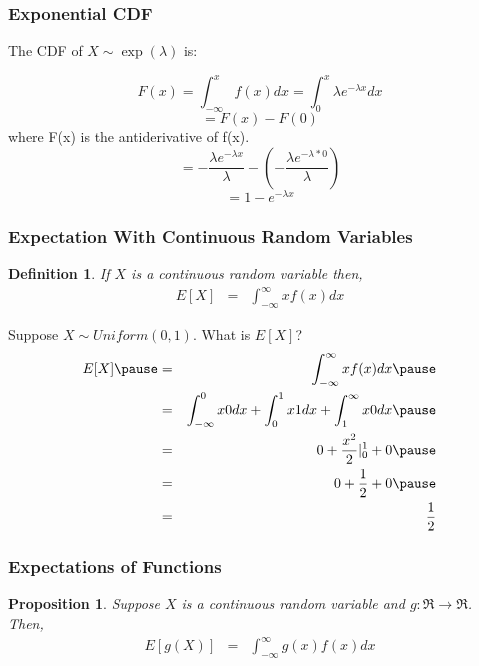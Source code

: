 \documentclass[handout]{beamer}
\newtheorem{prop}{Proposition}
\newtheorem{defn}{Definition}
\numberwithin{equation}{section}
\begin{document}
\begin{frame}
\frametitle{Exponential CDF}
The CDF of $X\sim\exp(\lambda)$ is:

$$F(x)= \int_{-\infty}^x f(x)dx=\int_{0}^x \lambda e^{-\lambda x}dx$$\pause
$$= F(x)-F(0)$$\pause
where F(x) is the antiderivative of f(x).\pause
$$= - \frac{\lambda e^{-\lambda x}}{\lambda} - (- \frac{\lambda e^{-\lambda*0}}{\lambda})$$\pause
$$=1-e^{-\lambda x}$$
\end{frame}



\begin{frame}
\frametitle{Expectation With Continuous Random Variables} 

\begin{defn} 
If $X$ is a continuous random variable then, 
\begin{eqnarray}
E[X] & = & \int_{-\infty}^{\infty} x f(x) dx \nonumber 
\end{eqnarray}
\end{defn} 


\end{frame}


\begin{frame}
Suppose $X \sim Uniform(0,1)$.  What is $E[X]$? \pause 
\begin{eqnarray}
E[X] \pause & = & \int_{-\infty}^{\infty} xf(x)dx \nonumber  \pause \\
& = & \int_{-\infty}^{0} x 0 dx + \int_{0}^{1} x 1 dx + \int_{1}^{\infty} x 0 dx \nonumber \pause  \\
& = & 0 +  \frac{x^{2}}{2} |^{1}_{0} + 0 \nonumber  \pause \\
& = & 0 + \frac{1}{2} + 0 \nonumber \pause \\
& = & \frac{1}{2} \nonumber 
\end{eqnarray}


\end{frame}


\begin{frame}
\frametitle{Expectations of Functions} 
\begin{prop} 
Suppose $X$ is a continuous random variable and $g:\Re \rightarrow \Re$.  Then, 
\begin{eqnarray}
E[g(X)] & = & \int_{-\infty}^{\infty} g(x)f(x)dx \nonumber 
\end{eqnarray}
\end{prop} 

\end{frame}
\end{document}

